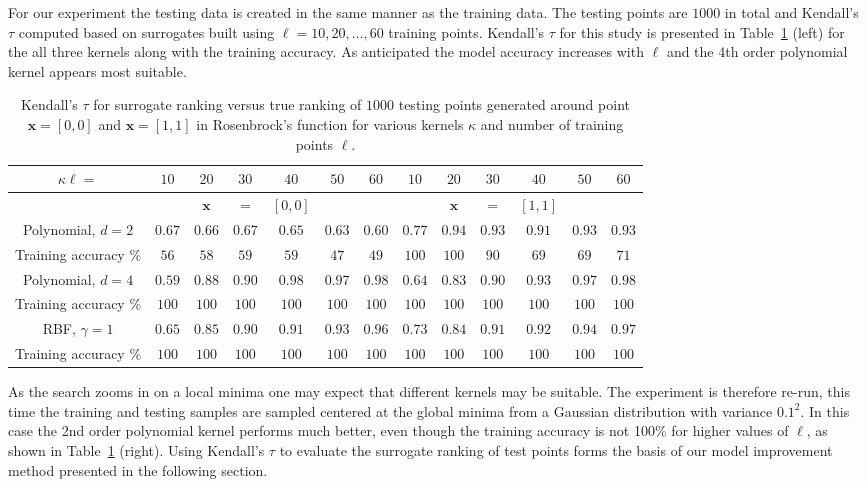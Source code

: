 \documentclass[10pt]{llncs}
\renewcommand{\vec}[1]{{\mbox{\boldmath$#1$}}}
\renewcommand{\vec}[1]{{\mathbf #1}}
\begin{document}
For our experiment the testing data is created in the same
manner as the training data.  The testing points are $1000$ in
total and Kendall's $\tau$ computed based on surrogates built
using $\ell=10,20,\ldots,60$ training points. Kendall's $\tau$
for this study is presented in Table~\ref{tbl:Rosenbrock} (left)
for the all three kernels along with the training accuracy. As
anticipated the model accuracy increases with $\ell$ and the 4th
order polynomial kernel appears most suitable.

\begin{table}[t!]
\centering
\caption{Kendall's $\tau$ for surrogate ranking versus
  true ranking of $1000$ testing points generated around point
  $\vec{x}=[0,0]$ and  $\vec{x}=[1,1]$ in Rosenbrock's function for various kernels $\kappa$ and number of
  training points $\ell$.}
\label{tbl:Rosenbrock}
{\footnotesize
\begin{tabular}{|c|cccccc||cccccc|}
\hline
$\kappa$\quad\quad\quad\quad\quad$\ell=$ & $10$ & $20$ & $30$ & $40$ & $50$ & $60$ & $10$ & $20$ & $30$ & $40$ & $50$ & $60$  \\
\hline
& &  $\vec{x}$ & $=$  & $[0,0]$ & & & & $\vec{x}$ & $=$  & $[1,1]$ & &  \\

\hline
Polynomial, $d=2$ & $0.67$ & $0.66$ & $0.67$ & $0.65$ & $0.63$ & $0.60$ & $0.77$ & $0.94$ & $0.93$ & $0.91$ & $0.93$ & $0.93$\\
Training accuracy \% & $56$ & $58$ & $59$ & $59$ & $47$ & $49$ & $100$ & $100$ & $90$ & $69$ & $69$ & $71$ \\
\hline
Polynomial, $d=4$ & $0.59$& $0.88$ & $0.90$ & $0.98$ & $0.97$ & $0.98$ & $0.64$ & $0.83$ & $0.90$ & $0.93$ & $0.97$ & $0.98$\\
Training accuracy \% & $100$ & $100$ & $100$ & $100$ & $100$ & $100$ & $100$ & $100$ & $100$ & $100$ & $100$ & $100$ \\
\hline 
RBF, $\gamma=1$ & $0.65$ & $0.85$ & $0.90$ & $0.91$ & $0.93$ & $0.96$ & $0.73$ & $0.84$ & $0.91$ & $0.92$ & $0.94$ & $0.97$ \\
Training accuracy \% & $100$ & $100$ & $100$ & $100$ & $100$ & $100$ & $100$ & $100$ & $100$ & $100$ & $100$ & $100$ \\ 
\hline 
\hline
\end{tabular}}
\end{table}

As the search zooms in on a local minima one may expect that
different kernels may be suitable. The experiment is therefore
re-run, this time the training and testing samples are sampled
centered at the global minima from a Gaussian distribution with
variance $0.1^2$. In this case the 2nd order polynomial kernel
performs much better, even though the training accuracy is not
100\% for higher values of $\ell$, as shown in
Table~\ref{tbl:Rosenbrock} (right). Using Kendall's $\tau$ to
evaluate the surrogate ranking of test points forms the basis of
our model improvement method presented in the following section.
\end{document}
